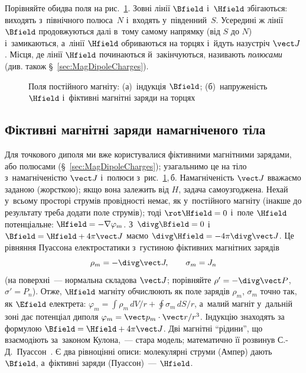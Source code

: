 Порівняйте обидва поля на рис.~\ref{pic:MagnetFields}. Зовні лінії $\Bfield$ і~$\Hfield$ збігаються: виходять з~північного полюса~$N$ і~входять у~південний~$S$. Усередині ж лінії $\Bfield$ продовжуються далі в~тому самому напрямку (від $S$ до $N$) і~замикаються, а~лінії $\Hfield$ обриваються на торцях і~йдуть назустріч $\vect J$. Місця, де лінії $\Hfield$ починаються й~закінчуються, називають \emph{полюсами} (див. також \S~\ref{sec:MagDipoleCharges}).

\begin{figure}[h!]\centering
	\caption{Поля постійного магніту: (а)~індукція $\Bfield$; (б)~напруженість $\Hfield$ і~фіктивні магнітні заряди на торцях\label{pic:MagnetFields}}
\end{figure}

\begin{Extra}
\subsection*{Фіктивні магнітні заряди намагніченого тіла\ExtraMark}

Для точкового диполя ми вже користувалися фіктивними магнітними зарядами, або полюсами (\S~\ref{sec:MagDipoleCharges}); узагальнимо це на тіло з~намагніченістю $\vect J$ і~полюси з~рис.~\ref{pic:MagnetFields},\,б. Намагніченість $\vect J$ вважаємо заданою (жорсткою); якщо вона залежить від $H$, задача самоузгоджена.
Нехай у~всьому просторі струмів провідності немає, як у~постійного магніту (інакше до результату треба додати поле струмів); тоді $\rot\Hfield=0$ і~поле $\Hfield$ потенціальне: $\Hfield=-\nabla\varphi_m$.
З~$\divg\Bfield=0$ і~$\Bfield=\Hfield+4\pi\vect J$ маємо $\divg\Hfield=-4\pi\divg\vect J$.
Це рівняння Пуассона електростатики з~густиною фіктивних магнітних зарядів
\begin{equation}\label{eq:MagCharges}
	\rho_m=-\divg\vect J,\qquad \sigma_m=J_n
\end{equation}
(на поверхні~--- нормальна складова $\vect J$; порівняйте $\rho'=-\divg\vect P$, $\sigma'=P_n$).
Отже, $\Hfield$ магніту обчислюють як поле зарядів $\rho_m$, $\sigma_m$ точно так, як $\Efield$ електрета: $\varphi_m=\int\rho_m\,dV/r+\oint\sigma_m\,dS/r$, а~малий магніт у~дальній зоні дає потенціал диполя $\varphi_m=\vect p_m\cdot\vect r/r^3$.
Індукцію знаходять за формулою $\Bfield=\Hfield+4\pi\vect J$.
Дві магнітні \enquote{рідини}, що взаємодіють за~законом Кулона,~--- стара модель; математично її розвинув С.-Д.~Пуассон~\cite{Poisson1826}. Є два рівноцінні описи: молекулярні струми (Ампер) дають $\Bfield$, а~фіктивні заряди (Пуассон)~--- $\Hfield$.


\end{Extra}
